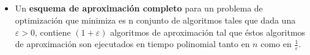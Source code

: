 \subsection{\subsectiontitle}
\begin{frame}{\subsectiontitle}
    \begin{itemize}
        \item Un \textbf{esquema de aproximación completo} para un problema de optimización que minimiza es n conjunto de algoritmos
        tales que dada una \(\varepsilon > 0\), contiene \((1 + \varepsilon)\) algoritmos de aproximación 
        tal que éstos algoritmos de aproximación son ejecutados en tiempo polinomial tanto en \(n\) como en \(\frac{1}{\varepsilon}\).
    \end{itemize}
\end{frame}